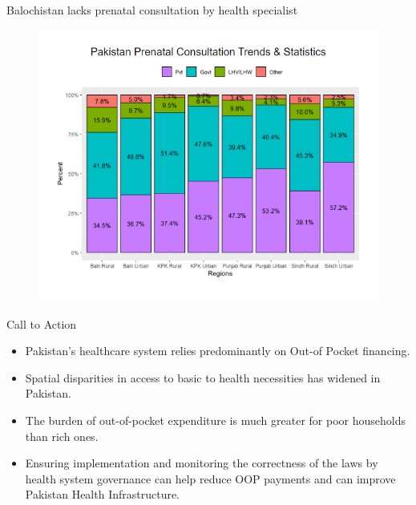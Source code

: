 \documentclass[
  ignorenonframetext,
]{beamer}
\begin{document}
\begin{frame}{Balochistan lacks prenatal consultation by health
specialist}
\protect\hypertarget{balochistan-lacks-prenatal-consultation-by-health-specialist}{}
\begin{figure}

{\centering \includegraphics{Prenatal-Statistics-crop.png}

}

\end{figure}
\end{frame}

\begin{frame}{Call to Action}
\protect\hypertarget{call-to-action}{}
\begin{itemize}
\item
  Pakistan's healthcare system relies predominantly on Out-of Pocket
  financing.
\item
  Spatial disparities in access to basic to health necessities has
  widened in Pakistan.
\item
  The burden of out-of-pocket expenditure is much greater for poor
  households than rich ones.
\item
  Ensuring implementation and monitoring the correctness of the laws by
  health system governance can help reduce OOP payments and can improve
  Pakistan Health Infrastructure.
\end{itemize}
\end{frame}



\end{document}
